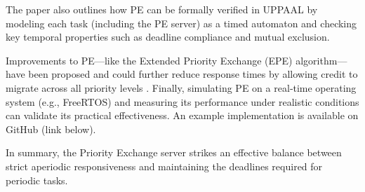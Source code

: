 \documentclass[conference]{IEEEtran}
\begin{document}
The paper also outlines how PE can be formally verified in UPPAAL by modeling each task (including the PE server) as a timed automaton and checking key temporal properties such as deadline compliance and mutual exclusion.

Improvements to PE—like the Extended Priority Exchange (EPE) algorithm—have been proposed and could further reduce response times by allowing credit to migrate across all priority levels \cite{sprunt1990aperiodic}. Finally, simulating PE on a real‐time operating system (e.g., FreeRTOS) and measuring its performance under realistic conditions can validate its practical effectiveness. An example implementation is available on GitHub (link below).

In summary, the Priority Exchange server strikes an effective balance between strict aperiodic responsiveness and maintaining the deadlines required for periodic tasks.



\end{document}
